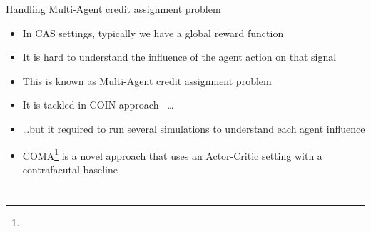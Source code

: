 \documentclass[presentation]{beamer}\mode<presentation>{\usetheme{AMSBolognaFC}}
\begin{document}
\begin{frame}{Handling Multi-Agent credit assignment problem}
	\begin{exampleblock}{}
		\begin{itemize}
			\item In CAS settings, typically we have a global reward function
			\item[{\color{red} \faThumbsDown}] It is hard to understand the influence of the agent action on that signal
			\item This is known as Multi-Agent credit assignment problem
			\item It is tackled in COIN approach~\parencite{wolpert1999introduction} \dots
			\item \dots but it required to run several simulations to understand each agent influence
			\item COMA\footnote[frame]{} is a novel approach that uses an Actor-Critic setting with a contrafacutal baseline 
		\end{itemize}
	\end{exampleblock}
\end{frame}



\section*{}
\end{document}
